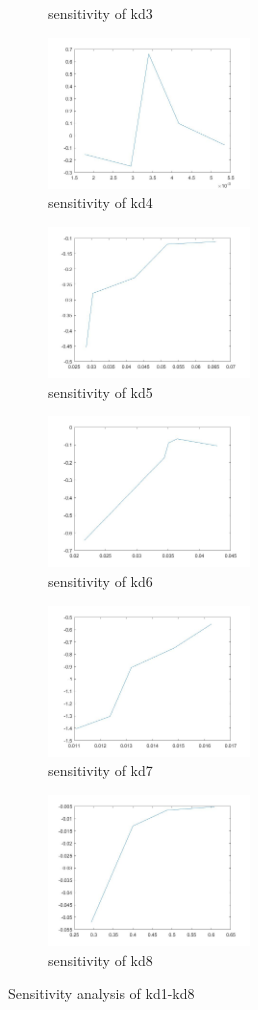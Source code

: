 \begin{figure}[H]
\begin{subfigure}{0.5\textwidth}
		\caption{sensitivity of kd3}
	\end{subfigure}%
	\begin{subfigure}{0.5\textwidth}
		\includegraphics[height=4cm]{sd4.jpg}
		\caption{sensitivity of kd4}
	\end{subfigure}
	\begin{subfigure}{0.5\textwidth}
		\includegraphics[height=4cm]{sd5.jpg}
		\caption{sensitivity of kd5}
	\end{subfigure}%
	\begin{subfigure}{0.5\textwidth}
		\includegraphics[height=4cm]{sd6.jpg}
		\caption{sensitivity of kd6}
	\end{subfigure}
	\begin{subfigure}{0.5\textwidth}
		\includegraphics[height=4cm]{sd7.jpg}
		\caption{sensitivity of kd7}
	\end{subfigure}%
	\begin{subfigure}{0.5\textwidth}
		\includegraphics[height=4cm]{sd8.jpg}
		\caption{sensitivity of kd8}
	\end{subfigure}
	\caption{Sensitivity analysis of kd1-kd8}
\end{figure}

